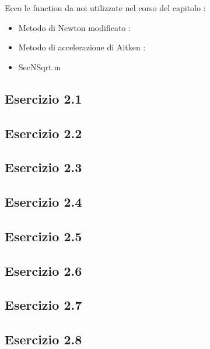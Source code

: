Ecco le function da noi utilizzate nel corso del capitolo :

\begin{itemize}

\item Metodo di Newton modificato :


\item Metodo di accelerazione di Aitken :


\item SecNSqrt.m


\end{itemize}

\subsection{\textbf{Esercizio 2.1}}

\subsection{\textbf{Esercizio 2.2}}

\subsection{\textbf{Esercizio 2.3}}

\subsection{\textbf{Esercizio 2.4}}

\subsection{\textbf{Esercizio 2.5}}

\subsection{\textbf{Esercizio 2.6}}

\subsection{\textbf{Esercizio 2.7}}

\subsection{\textbf{Esercizio 2.8}}

